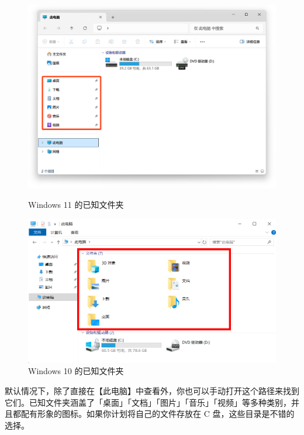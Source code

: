 {{{{\begin{figure}[htb!]
  \centering
  \begin{minipage}{.49\textwidth}
    \centering
    \includegraphics[width=.98\textwidth]{assets/basic/Win11_user_folders.png}
    \caption{Windows 11 的已知文件夹}
    \label{fig:Win11_user_folders}
  \end{minipage}
  \begin{minipage}{.49\textwidth}
    \centering
    \includegraphics[width=.98\textwidth]{assets/basic/User_directories.png}
    \caption{Windows 10 的已知文件夹}
    \label{fig:User_directories}
  \end{minipage}
\end{figure}

默认情况下，\cprotect{}除了直接在【此电脑】中查看外，你也可以手动打开这个路径来找到它们。已知文件夹涵盖了「桌面」「文档」「图片」「音乐」「视频」等多种类别，并且都配有形象的图标。如果你计划将自己的文件存放在 C 盘，这些目录是不错的选择。

}}}}
